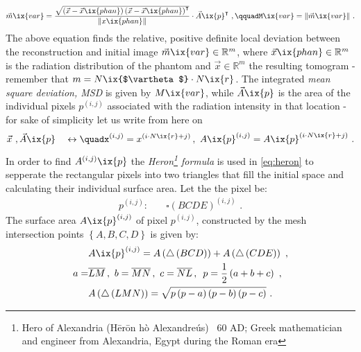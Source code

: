         \begin{align}%
            \vec{m}\ix{var}=\frac{\sqrt{\left(\vec{x}-\vec{x}\ix{phan}\right)\left(\vec{x}-\vec{x}\ix{phan}\right)^{\intercal}}}{\|x\ix{phan}\|}\cdot\vec{A}\ix{p}^{\intercal}\,\,,\qquad%
            M\ix{var}=\|\vec{m}\ix{var}\|\,\,.%
            \label{eq:msd}%
        \end{align}%
%
        The above equation finds the relative, positive definite local deviation between the reconstruction and initial image $\vec{m}\ix{var}\in\mathbb{R}^{m}$, where $\vec{x}\ix{phan}\in\mathbb{R}^{m}$ is the radiation distribution of the phantom and $\vec{x}\in\mathbb{R}^{m}$ the resulting tomogram - remember that $m=N\ix{$\vartheta$}\cdot N\ix{r}$. The integrated \textit{mean square deviation, MSD} is given by $M\ix{var}$, while $\vec{A}\ix{p}$ is the area of the individual pixels $p^{\left(i,j\right)}$ associated with the radiation intensity in that location - for sake of simplicity let us write from here on%
%
        \begin{align}%
            \vec{x}\,\,,\vec{A}\ix{p}\quad\leftrightarrow\quad%
            x^{\left(i,j\right)}=x^{\left(i\cdot N\ix{r}+j\right)}\,,\,\,%
            A\ix{p}^{\left(i,j\right)}=A\ix{p}^{\left(i\cdot N\ix{r}+j\right)}%
            \,\,.\nonumber%
        \end{align}%
%
        In order to find $A^{\left(i,j\right)}\ix{p}$ the \textit{Heron\footnote[1]{Hero of Alexandria (Hērōn hò Alexandreús) \textdagger~60 AD; Greek mathematician and engineer from Alexandria, Egypt during the Roman era} formula} is used in \cref{eq:heron} to sepperate the rectangular pixels into two triangles that fill the initial space and calculating their individual surface area. Let the the pixel be:
%
        \begin{align}%
            p^{\left(i,j\right)}:&\quad\square\left(BCDE\right)^{\left(i,j\right)}\,\,.\nonumber%
        \end{align}%
%
        The surface area $A\ix{p}^{\left(i,j\right)}$ of pixel $p^{\left(i,j\right)}$, constructed by the mesh intersection points $\left\{A,B,C,D\right\}$ is given by:
%
        \begin{align}%
            \begin{split}%
                &A\ix{p}^{\left(i,j\right)}=A\left(\bigtriangleup\left(BCD\right)\right)+A\left(\bigtriangleup\left(CDE\right)\right)\,\,,\\%
                a=&\overline{LM}\,,\,\,b=\overline{MN}\,,\,\,c=\overline{NL}\,,\,\,\,p=\frac{1}{2}\left(a+b+c\right)\,\,,\\%
                &A\left(\bigtriangleup\left(LMN\right)\right)=\sqrt{p\left(p-a\right)\left(p-b\right)\left(p-c\right)}\,\,.%
            \end{split}\label{eq:heron}%
        \end{align}%

